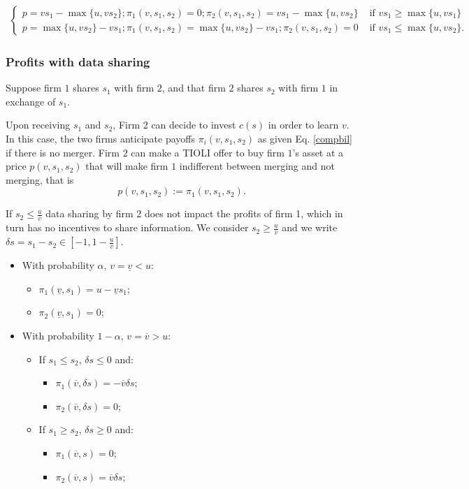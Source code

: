 \documentclass[a4paper,leqno]{article}%
\renewcommand{\a}{\alpha}
\newcommand{\uv}{\underline{v}}
\newcommand{\ov}{\overline{v}}
\begin{document}
\begin{align}\label{compbil}
\begin{cases}
    p=v s_1-\max\{u,v s_2\}; \pi_1(v,s_1,s_2)=0; \pi_2(v,s_1,s_2)=v s_1-\max\{u,v s_2\} & \text{ if }v s_1\geq \max\{u,v s_1\}\\ 
    p=\max\{u,v s_2\}-v s_1; \pi_1(v,s_1,s_2)=\max\{u,v s_2\}-v s_1; \pi_2(v,s_1,s_2)=0 & \text{ if }v s_1\leq \max\{u,v s_2\}.
\end{cases}
\end{align}


\subsubsection{Profits with data sharing}

Suppose firm $1$ shares $s_1$ with firm $2$, and that firm $2$ shares $s_2$ with firm $1$ in exchange of $s_1$. 

Upon receiving $s_1$ and $s_2$, Firm 2 can decide to invest $c(s)$ in order to learn $v$. In this case, the two firms anticipate payoffs $\pi_i(v, s_1,s_2)$ as given  Eq. \eqref{compbil} if there is no merger. Firm $2$ can make a TIOLI offer to buy firm $1$'s asset at a price $p(v, s_1,s_2)$ that will make firm $1$ indifferent between merging and not merging, that is 
%
\begin{equation}\label{merger-pricebil}
    p(v, s_1,s_2):=\pi_1(v, s_1,s_2).  
\end{equation}


If $s_2\leq \frac{u}{\ov}$ data sharing by firm 2 does not impact the profits of firm 1, which in turn has no incentives to share information. We consider $s_2\geq \frac{u}{\ov}$ and we write $\delta s=s_1-s_2\in [-1,1-\frac{u}{\ov}]$.

%
\begin{itemize}
    \item With probability $\a$, $v=\uv<u$:
\begin{itemize}
    \item $\pi_1(\uv,s_1)=u-\uv s_1$;
    \item $\pi_2(\uv,s_1)=0$;
\end{itemize}
    \item With probability $1-\a$, $v=\ov>u$:
\begin{itemize}
    \item If $ s_1\leq s_2$, $\delta s\leq 0$ and:
\begin{itemize}
    \item $\pi_1(\ov,\delta s)=-\ov \delta s$;
    \item $\pi_2(\ov,\delta s)=0$;
\end{itemize}    
    \item If $s_1\geq s_2$, $\delta s\geq 0$ and:
\begin{itemize}
    \item $\pi_1(\ov,s)=0$;
    \item $\pi_2(\ov,s)=\ov \delta s$;
\end{itemize}
\end{itemize}
\end{itemize}
\end{document}
